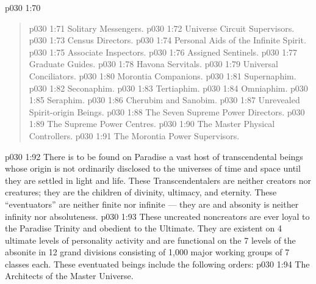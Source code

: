\vs p030 1:70 \bibnobreakspace {}
\begin{quote}
\vs p030 1:71 \bibnobreakspace Solitary Messengers.
\vs p030 1:72 \bibnobreakspace Universe Circuit Supervisors.
\vs p030 1:73 \bibnobreakspace Census Directors.
\vs p030 1:74 \bibnobreakspace Personal Aids of the Infinite Spirit.
\vs p030 1:75 \bibnobreakspace Associate Inspectors.
\vs p030 1:76 \bibnobreakspace Assigned Sentinels.
\vs p030 1:77 \bibnobreakspace Graduate Guides.
\vs p030 1:78 \bibnobreakspace Havona Servitals.
\vs p030 1:79 \bibnobreakspace Universal Conciliators.
\vs p030 1:80 \bibnobreakspace Morontia Companions.
\vs p030 1:81 \bibnobreakspace Supernaphim.
\vs p030 1:82 \bibnobreakspace Seconaphim.
\vs p030 1:83 \bibnobreakspace Tertiaphim.
\vs p030 1:84 \bibnobreakspace Omniaphim.
\vs p030 1:85 \bibnobreakspace Seraphim.
\vs p030 1:86 \bibnobreakspace Cherubim and Sanobim.
\vs p030 1:87 \bibnobreakspace Unrevealed Spirit\hyp{}origin Beings.
\vs p030 1:88 \bibnobreakspace The Seven Supreme Power Directors.
\vs p030 1:89 \bibnobreakspace The Supreme Power Centres.
\vs p030 1:90 \bibnobreakspace The Master Physical Controllers.
\vs p030 1:91 \bibnobreakspace The Morontia Power Supervisors.
\end{quote}
\vsetspace
\vs p030 1:92 \bibnobreakspace {} There is to be found on Paradise a vast host of transcendental beings whose origin is not ordinarily disclosed to the universes of time and space until they are settled in light and life. These Transcendentalers are neither creators nor creatures; they are the  children of divinity, ultimacy, and eternity. These “eventuators” are neither finite nor infinite --- they are  and absonity is neither infinity nor absoluteness.
\vs p030 1:93 These uncreated noncreators are ever loyal to the Paradise Trinity and obedient to the Ultimate. They are existent on 4 ultimate levels of personality activity and are functional on the 7 levels of the absonite in 12 grand divisions consisting of 1,000 major working groups of 7 classes each. These eventuated beings include the following orders:
\vs p030 1:94 \bibnobreakspace The Architects of the Master Universe.
